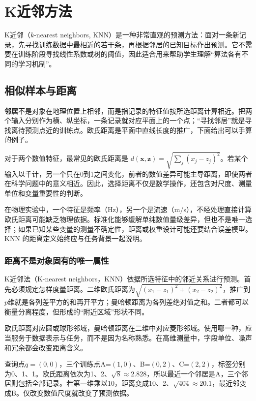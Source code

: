 \chapter{K近邻方法}

K近邻（$k$-nearest neighbors, KNN）是一种非常直观的预测方法：面对一条新记录，先寻找训练数据中最相近的若干条，再根据邻居的已知目标作出预测。它不需要在训练阶段寻找线性系数或树的阈值，因此适合用来帮助学生理解“算法各有不同的学习机制”。
\section{相似样本与距离}

\textbf{邻居}不是对象在地理位置上相邻，而是指记录的特征值按所选距离计算相近。把两个输入分别作为横、纵坐标，一条记录就对应平面上的一个点；“寻找邻居”就是寻找离待预测点近的训练点。欧氏距离是平面中直线长度的推广，下面给出可以手算的例子。

对于两个数值特征，最常见的欧氏距离是 $d(\mathbf x,\mathbf z)=\sqrt{\sum_j(x_j-z_j)^2}$。若某个输入以千计，另一个只在0到1之间变化，前者的数值差异可能主导距离，即使两者在科学问题中的意义相近。因此，选择距离不仅是数学操作，还包含对尺度、测量单位和变量重要性的判断。

在物理实验中，一个特征是频率（Hz），另一个是流速（m/s），不经处理直接计算欧氏距离可能缺乏物理依据。标准化能够缓解单纯数值量级差异，但也不是唯一选择；如果已知某些变量的测量不确定性，距离或权重设计可能还要结合误差模型。KNN 的距离定义始终应与任务背景一起说明。

\subsection{距离不是对象固有的唯一属性}
K近邻法（K-nearest neighbors，KNN）依据所选特征中的邻近关系进行预测。首先必须规定怎样度量距离。二维欧氏距离为$\sqrt{(x_1-z_1)^2+(x_2-z_2)^2}$，推广到$p$维就是各列差平方的和再开平方；曼哈顿距离为各列差绝对值之和。二者都可以衡量分离程度，但形成的“附近区域”形状不同。

欧氏距离对应圆或球形邻域，曼哈顿距离在二维中对应菱形邻域。使用哪一种，应当服务于数据表示与任务，而不是因为名称熟悉。在高维测量中，字段单位、噪声和冗余都会改变距离含义。

查询点$q=(0,0)$，三个训练点A=$(1,0)$、B=$(0,2)$、C=$(2,2)$，标签分别为0、1、1。欧氏距离依次为1、2、$\sqrt8\approx2.828$，所以最近一个邻居是A，三个邻居则包括全部记录。若第一维乘以10，距离变成10、2、$\sqrt{404}\approx20.1$，最近邻变成B。仅改变数值尺度就改变了预测依据。

